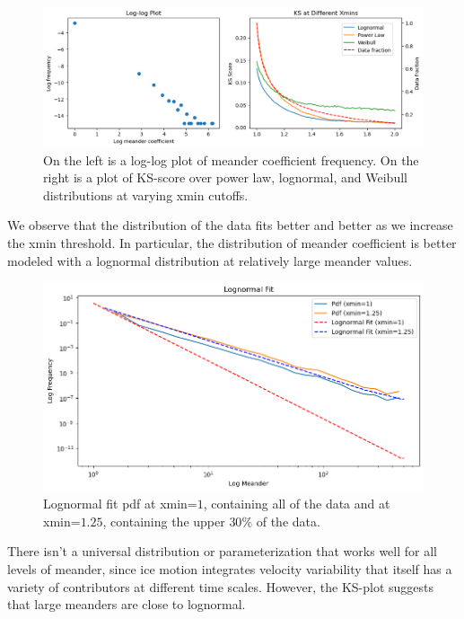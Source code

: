\documentclass[12pt]{article}
\begin{document}
\begin{figure}[H]
    \centering
    \includegraphics[width=\textwidth]{../graphs/distribution_ks.png}
    \caption{\small On the left is a log-log plot of meander coefficient frequency.
    On the right is a plot of KS-score over power law, lognormal, and Weibull distributions
    at varying xmin cutoffs.}
\end{figure}
\noindent
We observe that the distribution of the data fits better and better 
as we increase the xmin threshold. In particular, the distribution of 
meander coefficient is better modeled with a lognormal distribution at 
relatively large meander values. 


\begin{figure}[H]
    \centering
    \includegraphics[width=\textwidth]{../graphs/log_normal.png}
    \caption{\small Lognormal fit pdf at xmin=$1$, containing all of the 
    data and at xmin=$1.25$, containing the upper $30\%$ of the data.}
\end{figure}

\noindent
There isn’t a universal distribution or parameterization
that works well for all levels of meander, since ice motion 
integrates velocity variability 
that itself has a variety of contributors at different time scales. 
However, the KS-plot suggests that large meanders are close to lognormal.
\end{document}

